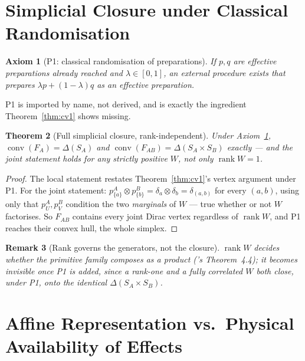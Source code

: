 \documentclass[11pt,a4paper]{article}
\newtheorem{theorem}{Theorem}[section]
\newtheorem{remark}[theorem]{Remark}
\newtheorem{axiom}[theorem]{Axiom}
\newcommand{\SA}{S_A}
\newcommand{\SB}{S_B}
\newcommand{\FA}{F_A}
\newcommand{\FAB}{F_{AB}}
\newcommand{\conv}{\operatorname{conv}}
\newcommand{\rk}{\operatorname{rank}}
\newcommand{\dd}{\delta}
\begin{document}
  \section{Simplicial Closure under Classical Randomisation}
  \label{sec:closure}

    \begin{axiom}[P1: classical randomisation of preparations]
      \label{ax:p1}
      If $p, q$ are effective preparations already reached and $\lambda \in [0,1]$, an external procedure
      exists that prepares $\lambda p + (1-\lambda) q$ as an effective preparation.
    \end{axiom}

    P1 is imported by name, not derived, and is exactly the ingredient Theorem~\ref{thm:cv1} shows missing.

    \begin{theorem}[Full simplicial closure, rank-independent]
      \label{thm:cv6}
      Under Axiom~\ref{ax:p1}, $\conv(\FA) = \Delta(\SA)$ and $\conv(\FAB) = \Delta(\SA \times \SB)$ exactly
      --- and the joint statement holds for \emph{any} strictly positive $W$, not only $\rk W = 1$.
    \end{theorem}

    \begin{proof}
      The local statement restates Theorem~\ref{thm:cv1}'s vertex argument under P1.
      For the joint statement: $p_{\{a\}}^A \otimes p_{\{b\}}^B = \dd_a \otimes \dd_b = \dd_{(a,b)}$ for every
      $(a,b)$, using only that $p_U^A, p_V^B$ condition the two \emph{marginals} of $W$ --- true whether or
      not $W$ factorises.
      So $\FAB$ contains every joint Dirac vertex regardless of $\rk W$, and P1 reaches their convex hull,
      the whole simplex.
    \end{proof}

    \begin{remark}[Rank governs the generators, not the closure]
      \label{rem:cv7}
      $\rk W$ decides whether the \emph{primitive} family composes as a product (\cite{Beau2026esub}'s
      Theorem~4.4); it becomes invisible once P1 is added, since a rank-one and a fully correlated $W$ both
      close, under P1, onto the identical $\Delta(\SA \times \SB)$.
    \end{remark}

  \section{Affine Representation vs.\ Physical Availability of Effects}
  \label{sec:ea}
\end{document}
